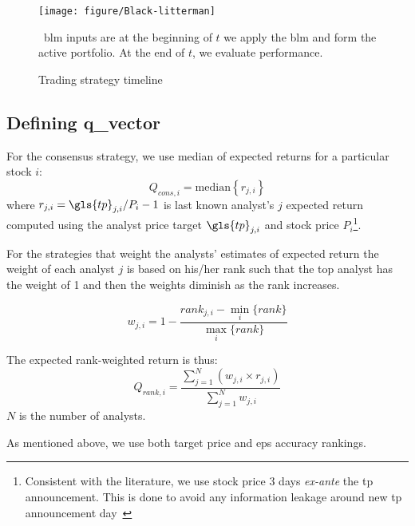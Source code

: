 \documentclass[a4paper,twoside,12pt,openright,notitlepage]{report}\usepackage[]{graphicx}\usepackage[]{color}
\begin{document}
\begin{figure}
\begin{center}
\texttt{[image: figure/Black-litterman]}
\end{center}
\caption{Trading strategy timeline}
\label{fig:bl}
\ \gls{blm} inputs are at the beginning of $t$ we apply the \gls{blm} and form the active portfolio. At the end of $t$, we evaluate performance.
\end{figure}


\subsection{Defining \gls{q_vector}}
\label{def-q}

For the consensus strategy, we use median of expected returns for a particular stock $i$:
\begin{equation}
\label{consq}
Q_{cons,i}= \mathrm{median} \left\{r_{j,i}\right\}
\end{equation}
where $r_{j,i}=\gls{tp}_{j,i}/P_{i}-1$  is last known analyst's $j$ expected return computed using the analyst price target $\gls{tp}_{j,i}$ and stock price $P_{i}$\footnote{Consistent with the literature, we use stock price 3 days \emph{ex-ante} the \gls{tp} announcement. This is done to avoid any information leakage around new \gls{tp} announcement day~\citep{bonini2010}}.

For the strategies that weight the analysts' estimates of expected return the weight of each analyst $j$ is based on his/her rank such that the top analyst has the weight of 1 and then the weights diminish as the rank increases.


\begin{equation}
\label{eq:weight}
w_{j,i}=1-\frac{rank_{j,i}-\min_i{ \{rank \} }}{\max_i{\{rank \}}}
\end{equation}

The expected rank-weighted return is thus:
\begin{equation}
\label{rankq}
Q_{rank,i}=\frac{\sum_{j=1}^{N} (w_{j,i} \times r_{j,i})}{\sum_{j=1}^{N} w_{j,i}}
\end{equation}
$N$ is the number of analysts.

As mentioned above, we use both target price and \gls{eps} accuracy rankings.


\end{document}
